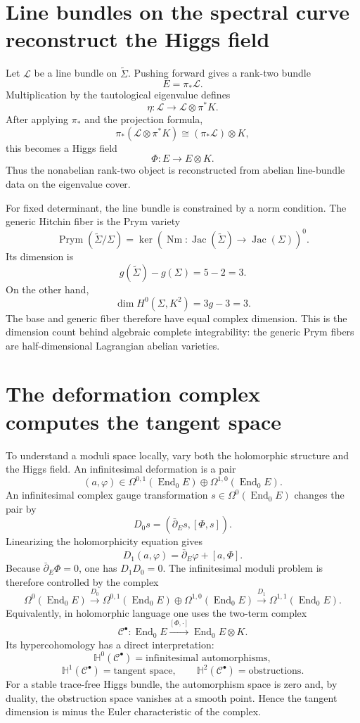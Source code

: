 \section{Line bundles on the spectral curve reconstruct the Higgs field}

Let \(\mathcal L\) be a line bundle on \(\widetilde\Sigma\).  Pushing forward gives a rank-two bundle
\[
  E=\pi_*\mathcal L.
\]
Multiplication by the tautological eigenvalue defines
\[
  \eta:\mathcal L
  \longrightarrow
  \mathcal L\otimes\pi^*K.
\]
After applying \(\pi_*\) and the projection formula,
\[
  \pi_*(\mathcal L\otimes\pi^*K)
  \cong(\pi_*\mathcal L)\otimes K,
\]
this becomes a Higgs field
\[
  \Phi:E\longrightarrow E\otimes K.
\]
Thus the nonabelian rank-two object is reconstructed from abelian line-bundle data on the eigenvalue cover.

For fixed determinant, the line bundle is constrained by a norm condition.  The generic Hitchin fiber is the Prym variety
\[
  \operatorname{Prym}(\widetilde\Sigma/\Sigma)
  =\ker\!\left(
  \operatorname{Nm}:\operatorname{Jac}(\widetilde\Sigma)
  \to\operatorname{Jac}(\Sigma)
  \right)^0.
\]
Its dimension is
\[
  g(\widetilde\Sigma)-g(\Sigma)=5-2=3.
\]
On the other hand,
\[
  \dim H^0(\Sigma,K^2)=3g-3=3.
\]
The base and generic fiber therefore have equal complex dimension.  This is the dimension count behind algebraic complete integrability: the generic Prym fibers are half-dimensional Lagrangian abelian varieties.

\section{The deformation complex computes the tangent space}

To understand a moduli space locally, vary both the holomorphic structure and the Higgs field.  An infinitesimal deformation is a pair
\[
  (a,\varphi)
  \in
  \Omega^{0,1}(\operatorname{End}_0E)
  \oplus
  \Omega^{1,0}(\operatorname{End}_0E).
\]
An infinitesimal complex gauge transformation \(s\in\Omega^0(\operatorname{End}_0E)\) changes the pair by
\[
  D_0s=(\bar\partial_Es,[\Phi,s]).
\]
Linearizing the holomorphicity equation gives
\[
  D_1(a,\varphi)
  =\bar\partial_E\varphi+[a,\Phi].
\]
Because \(\bar\partial_E\Phi=0\), one has \(D_1D_0=0\).  The infinitesimal moduli problem is therefore controlled by the complex
\[
  \Omega^0(\operatorname{End}_0E)
  \xrightarrow{D_0}
  \Omega^{0,1}(\operatorname{End}_0E)
  \oplus
  \Omega^{1,0}(\operatorname{End}_0E)
  \xrightarrow{D_1}
  \Omega^{1,1}(\operatorname{End}_0E).
\]
Equivalently, in holomorphic language one uses the two-term complex
\[
  \mathcal C^\bullet:
  \operatorname{End}_0E
  \xrightarrow{[\Phi,\cdot]}
  \operatorname{End}_0E\otimes K.
\]
Its hypercohomology has a direct interpretation:
\[
  \mathbb H^0(\mathcal C^\bullet)=\text{infinitesimal automorphisms},
\]
\[
  \mathbb H^1(\mathcal C^\bullet)=\text{tangent space},
  \qquad
  \mathbb H^2(\mathcal C^\bullet)=\text{obstructions}.
\]
For a stable trace-free Higgs bundle, the automorphism space is zero and, by duality, the obstruction space vanishes at a smooth point.  Hence the tangent dimension is minus the Euler characteristic of the complex.

